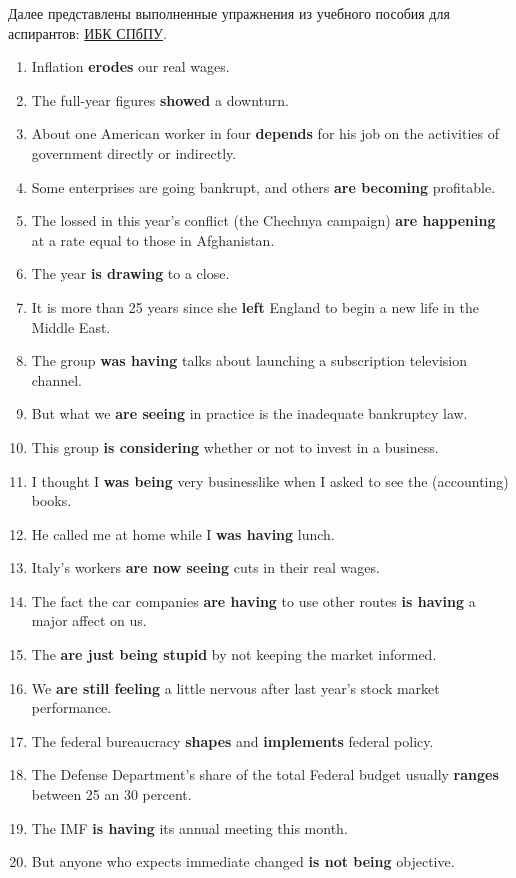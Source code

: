 \documentclass[main.tex]{subfiles}
\begin{document}
\setcounter{secnumdepth}{0}

\setcounter{section}{104}

Далее представлены выполненные упражнения из учебного пособия для аспирантов: \href{https://elib.spbstu.ru/dl/2/s19-119.pdf/info}{ИБК СПбПУ}.

\setcounter{subsection}{1}


\begin{enumerate}[nosep,leftmargin=*]
	\itemsep\eitsp
	\item Inflation \textbf{erodes} our real wages.
	\item The full-year figures \textbf{showed} a downturn.
	\item About one American worker in four \textbf{depends} for his job on the activities of government directly or indirectly.
	\item Some enterprises are going bankrupt, and others \textbf{are becoming} profitable.
	\item The lossed in this year's conflict (the Chechnya campaign) \textbf{are happening} at a rate equal to those in Afghanistan.
	\item The year \textbf{is drawing} to a close.
	\item It is more than 25 years since she \textbf{left} England to begin a new life in the Middle East.
	\item The group \textbf{was having} talks about launching a subscription television channel.
	\item But what we \textbf{are seeing} in practice is the inadequate bankruptcy law.
	\item This group \textbf{is considering} whether or not to invest in a business.
	\item I thought I \textbf{was being} very businesslike when I asked to see the (accounting) books.
	\item He called me at home while I \textbf{was having} lunch.
	\item Italy's workers \textbf{are now seeing} cuts in their real wages.
	\item The fact the car companies \textbf{are having} to use other routes \textbf{is having} a major affect on us.
	\item The \textbf{are just being stupid} by not keeping the market informed.
	\item We \textbf{are still feeling} a little nervous after last year's stock market performance.
	\item The federal bureaucracy \textbf{shapes} and \textbf{implements} federal policy.
	\item The Defense Department's share of the total Federal budget usually \textbf{ranges} between 25 an 30 percent.
	\item The IMF \textbf{is having} its annual meeting this month.
	\item But anyone who expects immediate changed \textbf{is not being} objective.
\end{enumerate}
\ 
\end{document}
